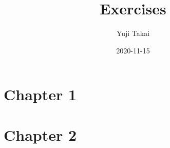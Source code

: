\documentclass[12pt]{article}
\title{Exercises}
\date{2020-11-15}
\author{Yuji Takai}
\begin{document}
    \maketitle
    \newpage
    \section{Chapter 1}
    
    \section{Chapter 2}
        \subsection{}
        \subsection{}
        \subsection{}
        \subsection{}
        \subsection{}
        \subsection{}
        \subsection{}
        \newpage
\end{document}
